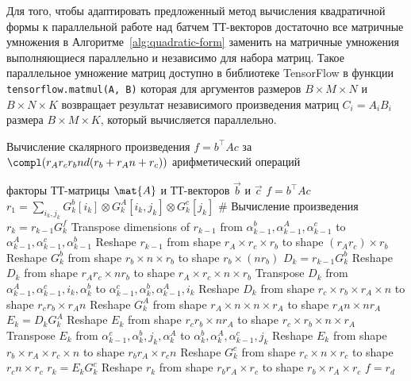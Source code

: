 Для того, чтобы адаптировать предложенный метод вычисления квадратичной формы к параллельной работе над батчем ТТ-векторов достаточно все матричные умножения в Алгоритме~\ref{alg:quadratic-form} заменить на матричные умножения выполняющиеся параллельно и независимо для набора матриц. Такое параллельное умножение матриц доступно в библиотеке TensorFlow в функции \texttt{tensorflow.matmul(A, B)} которая для аргументов размеров $B \times M \times N$ и $B \times N \times K$ возвращает результат независимого произведения матриц $C_i = A_i B_i$ размера $B \times M \times K$, который вычисляется параллельно.
%
\begin{algorithm}[tb]
   \caption{Вычисление скалярного произведения $f = b^\intercal A c$ за $\compl(r_A r_c r_b n d (r_b + r_A n + r_c))$ арифметический операций}
   \label{alg:quadratic-form}
\begin{algorithmic}[1]
   \REQUIRE факторы ТТ-матрицы $\mat{A}$ и ТТ-векторов $\vec{b}$ и $\vec{c}$
   \ENSURE $f = b^\intercal A c$
   \STATE $r_1 = \sum_{i_k, j_k} G_k^b[i_k] \otimes G_k^A[i_k, j_k] \otimes G_k^c[j_k]$
   \STATE \# Вычисление произведения $r_k = r_{k-1}G_k^f$
   \STATE Transpose dimensions of $r_{k-1}$ from $\alpha_{k-1}^b,\alpha_{k-1}^A, \alpha_{k-1}^c$ to $\alpha_{k-1}^A, \alpha_{k-1}^c,\alpha_{k-1}^b$
   \STATE Reshape $r_{k-1}$ from shape $r_A \times r_c \times r_b$ to shape $(r_A  r_c) \times r_b$
   \STATE Reshape $G_k^b$ from shape $r_b \times n \times r_b$ to shape $r_b \times (n r_b)$
   \STATE $D_k = r_{k-1} G_k^b$ 
   \STATE Reshape $D_k$ from shape $r_A r_c \times n r_b$ to shape $r_A \times r_c \times n \times r_b$
   \STATE Transpose $D_k$ from $\alpha_{k-1}^A, \alpha_{k-1}^c,i_k,\alpha_{k}^b$ to $\alpha_{k-1}^c,\alpha_{k}^b,\alpha_{k-1}^A,i_k$
   \STATE Reshape $D_k$ from shape $r_c \times r_b \times r_A \times n$ to shape $r_c r_b \times r_A n$
   \STATE Reshape $G_k^A$ from shape $r_A \times n \times n \times r_A$ to shape $r_A n \times n r_A$
   \STATE $E_k = D_k G_k^A$ 
   \STATE Reshape $E_k$ from shape $r_c r_b \times n r_A$ to shape $r_c \times r_b \times n \times r_A$
   \STATE Transpose $E_k$ from $\alpha_{k-1}^c, \alpha_{k}^b,j_k,\alpha_{k}^A$ to $\alpha_{k}^b,\alpha_{k}^A,\alpha_{k-1}^c,j_k$
   \STATE Reshape $E_k$ from shape $r_b \times r_A \times r_c \times n$ to shape $r_b r_A \times r_c n$
   \STATE Reshape $G_k^c$ from shape $r_c \times n \times r_c$ to shape $r_c n \times r_c$
   \STATE $r_k = E_k G_k^c$ 
   \STATE Reshape $r_k$ from shape $r_b r_A \times r_c$ to shape $r_b \times r_A \times r_c$
   \ENDFOR
   \STATE $f = r_d$
\end{algorithmic}
\end{algorithm}



